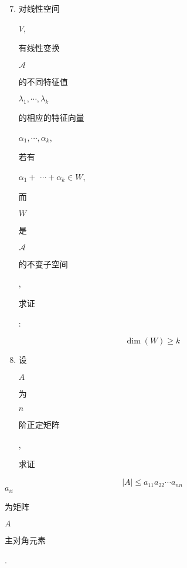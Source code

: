\documentclass[10pt]{article}
\begin{document}
\begin{enumerate}
  \setcounter{enumi}{6}
  \item \begin{CJK}{UTF8}{mj}对线性空间\end{CJK} $V$, \begin{CJK}{UTF8}{mj}有线性变换\end{CJK} $\mathscr{A}$ \begin{CJK}{UTF8}{mj}的不同特征值\end{CJK} $\lambda_{1}, \cdots, \lambda_{k}$ \begin{CJK}{UTF8}{mj}的相应的特征向量\end{CJK} $\alpha_{1}, \cdots, \alpha_{k}$, \begin{CJK}{UTF8}{mj}若有\end{CJK} $\alpha_{1}+$ $\cdots+\alpha_{k} \in W$, \begin{CJK}{UTF8}{mj}而\end{CJK} $W$ \begin{CJK}{UTF8}{mj}是\end{CJK} $\mathscr{A}$ \begin{CJK}{UTF8}{mj}的不变子空间\end{CJK}, \begin{CJK}{UTF8}{mj}求证\end{CJK}:
\end{enumerate}
$$
\operatorname{dim}(W) \geq k
$$

\begin{enumerate}
  \setcounter{enumi}{7}
  \item \begin{CJK}{UTF8}{mj}设\end{CJK} $A$ \begin{CJK}{UTF8}{mj}为\end{CJK} $n$ \begin{CJK}{UTF8}{mj}阶正定矩阵\end{CJK}, \begin{CJK}{UTF8}{mj}求证\end{CJK}
\end{enumerate}
$$
|A| \leq a_{11} a_{22} \cdots a_{n n}
$$
$a_{i i}$ \begin{CJK}{UTF8}{mj}为矩阵\end{CJK} $A$ \begin{CJK}{UTF8}{mj}主对角元素\end{CJK}.
\end{document}
